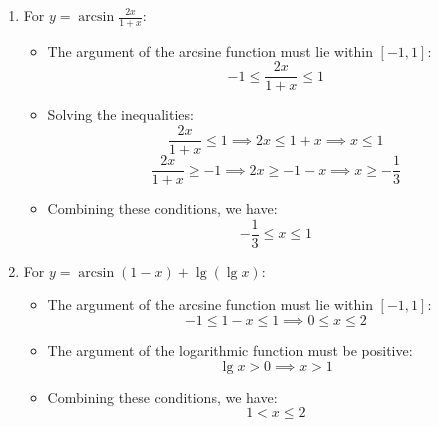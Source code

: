 \begin{solution}
\begin{enumerate}
    \item For \( y = \arcsin \frac{2x}{1+x} \):
    \begin{itemize}
        \item The argument of the arcsine function must lie within \([-1, 1]\):
        \[
        -1 \leq \frac{2x}{1+x} \leq 1
        \]
        \item Solving the inequalities:
        \[
        \frac{2x}{1+x} \leq 1 \implies 2x \leq 1 + x \implies x \leq 1
        \]
        \[
        \frac{2x}{1+x} \geq -1 \implies 2x \geq -1 - x \implies x \geq -\frac{1}{3}
        \]
        \item Combining these conditions, we have:
        \[
        -\frac{1}{3} \leq x \leq 1
        \]
    \end{itemize}

    \item For \( y = \arcsin (1-x) + \lg (\lg x) \):
    \begin{itemize}
        \item The argument of the arcsine function must lie within \([-1, 1]\):
        \[
        -1 \leq 1-x \leq 1 \implies 0 \leq x \leq 2
        \]
        \item The argument of the logarithmic function must be positive:
        \[
        \lg x > 0 \implies x > 1
        \]
        \item Combining these conditions, we have:
        \[
        1 < x \leq 2
        \]
    \end{itemize}
\end{enumerate}
\end{solution}

